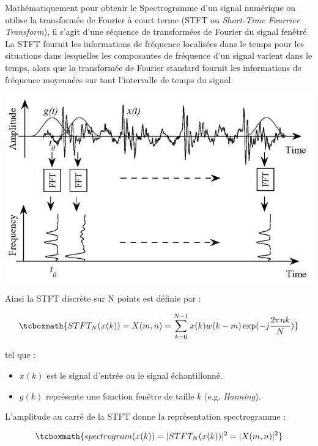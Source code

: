\documentclass[11pt, report, french]{scrreprt}
\begin{document}
Mathématiquement pour obtenir le Spectrogramme d'un signal numérique on utilise la transformée de Fourier à court terme (STFT ou \textit{Short-Time Fourrier Transform}), il s'agit d'une séquence de transformées de Fourier du signal fenêtré. La STFT fournit les informations de fréquence localisées dans le temps pour les situations dans lesquelles les composantes de fréquence d'un signal varient dans le temps, alors que la transformée de Fourier standard fournit les informations de fréquence moyennées sur tout l'intervalle de temps du signal.\\

\begin{center}
	\includegraphics[scale=0.35]{img/stft.png}
\end{center}


Ainsi la STFT discrète sur N points est définie par :

\begin{equation}
\tcboxmath{ STFT_N(x(k)) = X(m,n) = \sum_{k=0}^{N-1} x(k)w(k-m) \exp( -j \frac{2\pi nk}{N} ) }
\end{equation}

tel que : \\

\begin{itemize}
	\item $x(k)$ est le signal d'entrée ou le signal échantillonné.
	\item $g(k)$ représente une fonction fenêtre de taille $k$ (e.g. \textit{Hanning}).
\end{itemize}

\vspace{1cm}
L'amplitude au carré de la STFT donne la représentation spectrogramme :

\begin{equation}
\tcboxmath{ spectrogram( x(k) ) = |STFT_N( x(k) )|^2 = |X(m,n)|^2 }
\end{equation}
\end{document}
